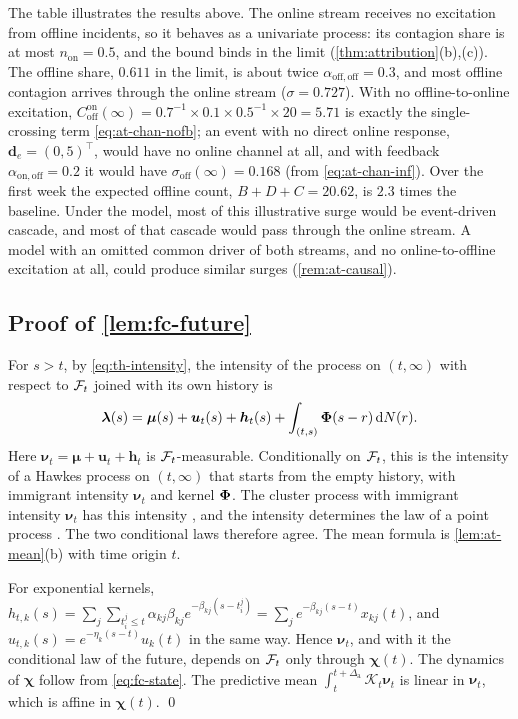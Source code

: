 The table illustrates the results above. The online stream receives no excitation from
offline incidents, so it behaves as a univariate process: its contagion share is at most
$n_{\mathrm{on}}=0.5$, and the bound binds in the limit (\cref{thm:attribution}(b),(c)). The
offline share, $0.611$ in the limit, is about twice $\alpha_{\mathrm{off},\mathrm{off}}=0.3$,
and most offline contagion arrives through the online stream ($\sigma=0.727$). With no
offline-to-online excitation,
$C^{\mathrm{on}}_{\mathrm{off}}(\infty)=0.7^{-1}\times0.1\times0.5^{-1}\times20=5.71$ is exactly
the single-crossing term \eqref{eq:at-chan-nofb}; an event with no direct online response,
$\bm d_e=(0,5)^{\top}$, would have no online channel at all, and with feedback
$\alpha_{\mathrm{on},\mathrm{off}}=0.2$ it would have $\sigma_{\mathrm{off}}(\infty)=0.168$
(from \eqref{eq:at-chan-inf}). Over the first week the expected offline count,
$B+D+C=20.62$, is $2.3$ times the baseline. Under the model, most of this illustrative surge
would be event-driven cascade, and most of that cascade would pass through the online
stream. A model with an omitted common driver of both streams, and no online-to-offline
excitation at all, could produce similar surges (\cref{rem:at-causal}).
\FloatBarrier

\subsection{Proof of \texorpdfstring{\cref{lem:fc-future}}{the conditional cluster lemma}}\label{app:fc-future}

For $s>t$, by \eqref{eq:th-intensity}, the intensity of the process on $(t,\infty)$
with respect to $\mathcal{F}_t$ joined with its own history is
\[
\bm\lambda(s)=\bm\mu(s)+\bm u_t(s)+\bm h_t(s)+\int_{(t,s)}\bm{\Phi}(s-r)\,\mathrm{d}N(r).
\]
Here $\bm\nu_t=\bm\mu+\bm u_t+\bm h_t$ is $\mathcal{F}_t$-measurable. Conditionally on
$\mathcal{F}_t$, this is the intensity of a Hawkes process on $(t,\infty)$ that starts from
the empty history, with immigrant intensity $\bm\nu_t$ and kernel $\bm{\Phi}$. The cluster
process with immigrant intensity $\bm\nu_t$ has this intensity \citep{hawkes1974}, and
the intensity determines the law of a point process \citep[Ch.~7]{daley2003}. The two
conditional laws therefore agree. The mean formula is \cref{lem:at-mean}(b) with time
origin $t$.

For exponential kernels,
$h_{t,k}(s)=\sum_j\sum_{t^j_i\le t}\alpha_{kj}\beta_{kj}e^{-\beta_{kj}(s-t^j_i)}=\sum_je^{-\beta_{kj}(s-t)}x_{kj}(t)$,
and $u_{t,k}(s)=e^{-\eta_k(s-t)}u_k(t)$ in the same way. Hence $\bm\nu_t$, and with it
the conditional law of the future, depends on $\mathcal{F}_t$ only through $\bm\chi(t)$. The
dynamics of $\bm\chi$ follow from \eqref{eq:fc-state}. The predictive mean
$\int_t^{t+\Delta_{\mathrm a}}\mathcal K_t\bm\nu_t$ is linear in $\bm\nu_t$, which is affine in
$\bm\chi(t)$. \qed

